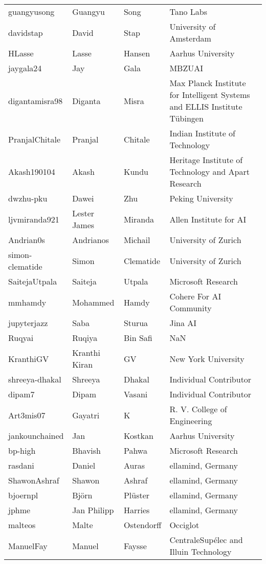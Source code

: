 \begin{table*}
{\begin{tabular}{llll}
guangyusong & Guangyu & Song & Tano Labs \\
davidstap & David & Stap & University of Amsterdam \\
HLasse & Lasse & Hansen & Aarhus University \\
jaygala24 & Jay & Gala & MBZUAI \\
digantamisra98 & Diganta & Misra & Max Planck Institute for Intelligent Systems and ELLIS Institute Tübingen \\
PranjalChitale & Pranjal & Chitale & Indian Institute of Technology \\
Akash190104 & Akash & Kundu & Heritage Institute of Technology and Apart Research \\
dwzhu-pku & Dawei & Zhu & Peking University \\
ljvmiranda921 & Lester James & Miranda & Allen Institute for AI \\
Andrian0s & Andrianos & Michail & University of Zurich \\
simon-clematide & Simon & Clematide & University of Zurich \\
SaitejaUtpala & Saiteja & Utpala & Microsoft Research \\
mmhamdy & Mohammed & Hamdy & Cohere For AI Community \\
jupyterjazz & Saba & Sturua & Jina AI \\
Ruqyai & Ruqiya & Bin Safi & NaN \\
KranthiGV & Kranthi Kiran & GV & New York University \\
shreeya-dhakal & Shreeya & Dhakal & Individual Contributor \\
dipam7 & Dipam & Vasani & Individual Contributor \\
Art3mis07 & Gayatri & K & R. V. College of Engineering \\
jankounchained & Jan & Kostkan & Aarhus University \\
bp-high & Bhavish & Pahwa & Microsoft Research \\
rasdani & Daniel & Auras & ellamind, Germany \\
ShawonAshraf & Shawon & Ashraf & ellamind, Germany \\
bjoernpl & Björn & Plüster & ellamind, Germany \\
jphme & Jan Philipp & Harries & ellamind, Germany \\
malteos & Malte & Ostendorff & Occiglot \\
ManuelFay & Manuel & Faysse & CentraleSupélec and Illuin Technology \\

\end{tabular}}
\end{table*}

